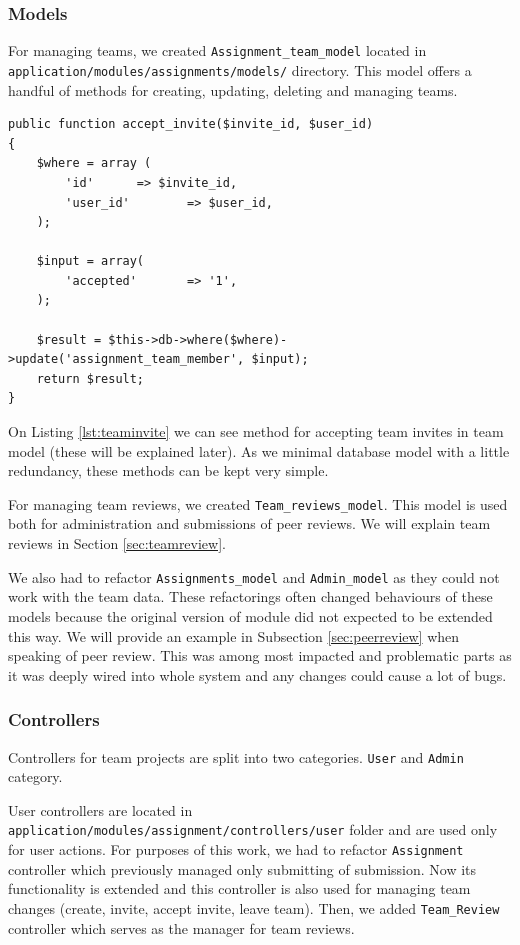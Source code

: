 \subsubsection{Models}
For managing teams, we created \texttt{Assignment\_team\_model} located in \\ \texttt{application/modules/assignments/models/} directory. This model offers a handful of methods for creating, updating, deleting and managing teams.

\begin{lstlisting}[caption={Method for accepting team invites},label={lst:teaminvite}]
public function accept_invite($invite_id, $user_id)
{
    $where = array (
        'id'      => $invite_id,
        'user_id'        => $user_id,
    );

    $input = array(
        'accepted'       => '1',
    );

    $result = $this->db->where($where)->update('assignment_team_member', $input);
    return $result;
}
\end{lstlisting}

On Listing \ref{lst:teaminvite} we can see method for accepting team invites in team model (these will be explained later). As we minimal database model with a little redundancy, these methods can be kept very simple.

For managing team reviews, we created \texttt{Team\_reviews\_model}. This model is used both for administration and submissions of peer reviews. We will explain team reviews in Section \ref{sec:teamreview}.

We also had to refactor \texttt{Assignments\_model} and \texttt{Admin\_model} as they could not work with the team data. These refactorings often changed behaviours of these models because the original version of module did not expected to be extended this way. We will provide an example in Subsection \ref{sec:peerreview} when speaking of peer review. This was among most impacted and problematic parts as it was deeply wired into whole system and any changes could cause a lot of bugs.

\subsubsection{Controllers}
Controllers for team projects are split into two categories. \texttt{User} and \texttt{Admin} category.

User controllers are located in \\ \texttt{application/modules/assignment/controllers/user} folder and are used only for user actions. For purposes of this work, we had to refactor \texttt{Assignment} controller which previously managed only submitting of submission. Now its functionality is extended and this controller is also used for managing team changes (create, invite, accept invite, leave team). Then, we added \texttt{Team\_Review} controller which serves as the manager for team reviews.

